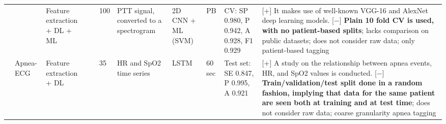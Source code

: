 \documentclass[5p,twocolumn,lefttitle]{elsarticle}
\begin{document}
\begin{table*}[t]
{\begin{tabularx}{2\textwidth}{@{}m{2.5em}p{7em}p{10em}lp{2em}p{12em}p{7em}p{3em}p{17em}X@{}}
                              &                                                         & Feature extraction + DL + ML                                   & \cite{tuncer2019deep}                    & 100           & PTT signal, converted to a spectrogram                                                                             & 2D CNN + ML (SVM)                   & PB                                & CV: SP 0.980, P 0.942, A 0.928, F1 0.929                                                                                                                                             & [+] It makes use of well-known VGG-16 and AlexNet deep learning models. [$-$] \textbf{Plain 10 fold CV is used, with no patient-based splits}; lacks comparison on public datasets; does not consider raw data; only patient-based tagging                                                                                                                                                                                                                                                    \\
            \cmidrule(l){2-10} 
                            & Apnea-ECG                                               & Feature extraction + DL                                        & \cite{pathinarupothi2017single}          & 35            & HR and SpO2 time series                                                                                           & LSTM                                & 60 sec                                     & Test set: SE 0.847, P 0.995, A 0.921                                                                                                                                                    & [+] A study on the relationship between apnea events, HR, and SpO2 values is conducted. [$-$] \textbf{Train/validation/test split done in a random fashion, implying that data for the same patient are seen both at training and at test time}; does not consider raw data; coarse granularity apnea tagging                                                                                                                                               \\
            \cmidrule(l){2-10} 

\end{tabularx}}
\end{table*}
\end{document}
